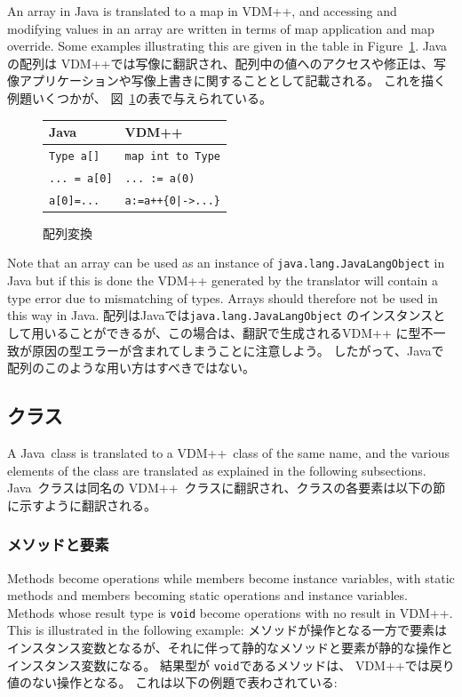 \documentclass[\pformat,12pt]{jarticle}
\newcommand{\JAVA}{Java}
\newcommand{\VDM}{VDM++}
\begin{document}
An array in Java is translated to a map in VDM++, and accessing and
modifying values in an array are written in terms of map application
and map override. Some examples illustrating this are given in
the table in Figure~\ref{fig:arrayxfs}. 
Javaの配列は VDM++では写像に翻訳され、配列中の値へのアクセスや修正は、写像アプリケーションや写像上書きに関することとして記載される。
これを描く例題いくつかが、 図~\ref{fig:arrayxfs}の表で与えられている。
\newpage
\begin{figure}[htbp]
  \begin{center}
\begin{longtable}{|l|l|}
\hline
  \JAVA\   & \VDM\ \\ \hline \hline
  \texttt{Type a[]}   & \texttt{map int to Type} \\ \hline
  \texttt{... = a[0]}   & \texttt{... := a(0)} \\ \hline
  \texttt{a[0]=...}   & \texttt{a:=a++\{0|->...\}} \\ \hline
\end{longtable}    
    \caption{配列変換}
    \label{fig:arrayxfs}
  \end{center}
\end{figure}

Note that an array can be used as an instance of
\texttt{java.lang.JavaLangObject} in Java but if this is done the
VDM++ generated by the translator will contain a type error due to
mismatching of types. Arrays should therefore not be used in this way
in Java. 
配列はJavaでは\texttt{java.lang.JavaLangObject} のインスタンスとして用いることができるが、この場合は、翻訳で生成されるVDM++ に型不一致が原因の型エラーが含まれてしまうことに注意しよう。
したがって、Javaで配列のこのような用い方はすべきではない。

\subsection{クラス}\label{class}

A \JAVA\ class is translated to a \VDM\ class of the same name, and
the various elements of the class are translated as explained in the
following subsections.
 \JAVA\ クラスは同名の \VDM\ クラスに翻訳され、クラスの各要素は以下の節に示すように翻訳される。

\subsubsection{メソッドと要素}\label{methods}

Methods become operations while members become instance variables,
with static methods and members becoming static operations and 
instance variables. Methods whose result type is \texttt{void}
become operations with no result in VDM++. This is illustrated in
the following example:  
メソッドが操作となる一方で要素はインスタンス変数となるが、それに伴って静的なメソッドと要素が静的な操作とインスタンス変数になる。
結果型が \texttt{void}であるメソッドは、 VDM++では戻り値のない操作となる。
これは以下の例題で表わされている:  
\end{document}
